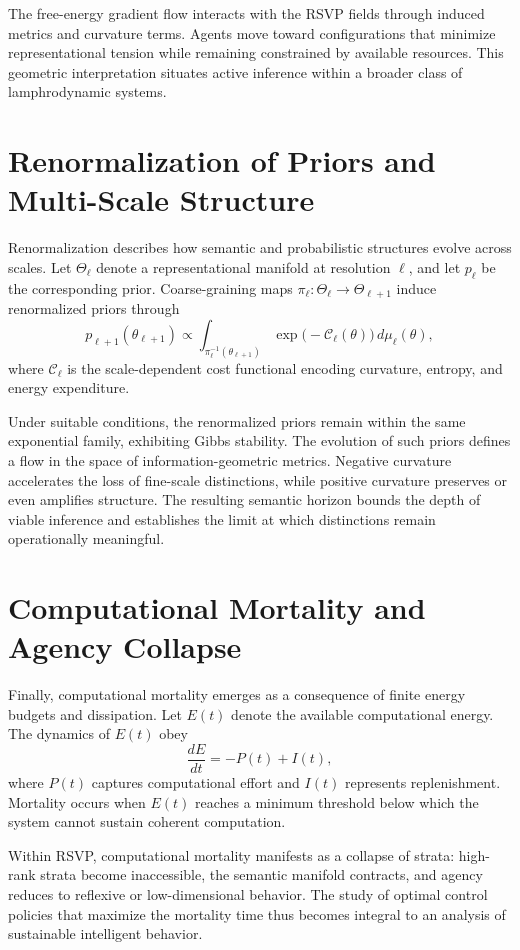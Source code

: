 \documentclass[12pt]{article}
\theoremstyle{plain}
\theoremstyle{definition}
\theoremstyle{remark}
\begin{document}
The free-energy gradient flow interacts with the RSVP fields through induced metrics and curvature terms. Agents move toward configurations that minimize representational tension while remaining constrained by available resources. This geometric interpretation situates active inference within a broader class of lamphrodynamic systems.

\section{Renormalization of Priors and Multi-Scale Structure}
\label{app:renormalization}

Renormalization describes how semantic and probabilistic structures evolve across scales. Let $\Theta_\ell$ denote a representational manifold at resolution $\ell$, and let $p_\ell$ be the corresponding prior. Coarse-graining maps $\pi_\ell : \Theta_\ell \to \Theta_{\ell+1}$ induce renormalized priors through
\[
p_{\ell+1}(\theta_{\ell+1})
\propto
\int_{\pi_\ell^{-1}(\theta_{\ell+1})}
\exp\big(-\mathcal{C}_\ell(\theta)\big)\,d\mu_\ell(\theta),
\]
where $\mathcal{C}_\ell$ is the scale-dependent cost functional encoding curvature, entropy, and energy expenditure.

Under suitable conditions, the renormalized priors remain within the same exponential family, exhibiting Gibbs stability. The evolution of such priors defines a flow in the space of information-geometric metrics. Negative curvature accelerates the loss of fine-scale distinctions, while positive curvature preserves or even amplifies structure. The resulting semantic horizon bounds the depth of viable inference and establishes the limit at which distinctions remain operationally meaningful.

\section{Computational Mortality and Agency Collapse}
\label{app:computational-mortality}

Finally, computational mortality emerges as a consequence of finite energy budgets and dissipation. Let $E(t)$ denote the available computational energy. The dynamics of $E(t)$ obey
\[
\frac{dE}{dt} = -P(t) + I(t),
\]
where $P(t)$ captures computational effort and $I(t)$ represents replenishment. Mortality occurs when $E(t)$ reaches a minimum threshold below which the system cannot sustain coherent computation.

Within RSVP, computational mortality manifests as a collapse of strata: high-rank strata become inaccessible, the semantic manifold contracts, and agency reduces to reflexive or low-dimensional behavior. The study of optimal control policies that maximize the mortality time thus becomes integral to an analysis of sustainable intelligent behavior.

\newpage
\printbibliography
\end{document}
